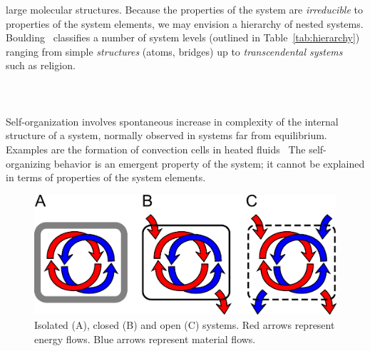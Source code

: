 \begin{svgraybox}
large molecular structures.
Because the properties of the system are
\emph{irreducible} to properties of the system elements,
we may envision a hierarchy of nested systems.
Boulding~\cite{Boulding1956} classifies a number
of system levels (outlined in Table~\ref{tab:hierarchy})
ranging from simple \emph{structures} (atoms, bridges) up
to \emph{transcendental systems} such as religion.
\\\\
\\\\
Self-organization involves spontaneous increase in complexity
of the internal structure of a system,
normally observed in systems far from equilibrium.
Examples are the formation of convection cells 
in heated fluids~\cite{Benard1901}
The self-organizing behavior is an
emergent property of the system;
it cannot be explained in terms of properties
of the system elements.
\end{svgraybox}

\begin{figure}
\label{fig:systems}
\begin{center}
\includegraphics[width=\linewidth]{Part_0/Chapter_Introduction/images/systems.pdf} 
\end{center}
\caption[Isolated, closed, and open systems]{Isolated (A), 
closed (B) and open (C) systems. 
Red arrows represent energy flows. 
Blue arrows represent material flows.}
\end{figure}

